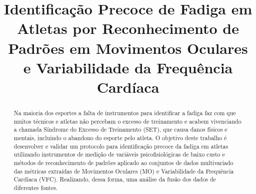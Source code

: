 \documentclass[10pt, conference, compsocconf]{IEEEtran}
\begin{document}
%
\title{
	Identificação Precoce de Fadiga em Atletas por Reconhecimento de Padrões em Movimentos Oculares e Variabilidade da Frequência Cardíaca
}

\newif\iffinal
\finaltrue
 
\iffinal
  \author{
     \and
      \and
  }
\else
    \author{Sibgrapi paper ID: 1806903277}
\fi

 

\maketitle
 
\begin{abstract}
	
	Na maioria dos esportes a falta de instrumentos para identificar a fadiga faz com que muitos técnicos e atletas não percebam o excesso de treinamento e acabem vivenciando a chamada Síndrome do Excesso de Treinamento (SET), que causa danos físicos e mentais, incluindo o abandono do esporte pelo atleta. 
	O objetivo deste trabalho é desenvolver e validar um protocolo para identificação precoce da fadiga em atletas utilizando instrumentos de medição de variáveis psicofisiológicas de baixo custo e métodos de reconhecimento de padrões aplicado ao conjuntos de dados multivariado das métricas extraídas de Movimentos Oculares (MO) e Variabilidade da Frequência Cardíaca (VFC). Realizando, dessa forma, uma análise da fusão dos dados de diferentes fontes.   
	
\end{abstract}
\end{document}
